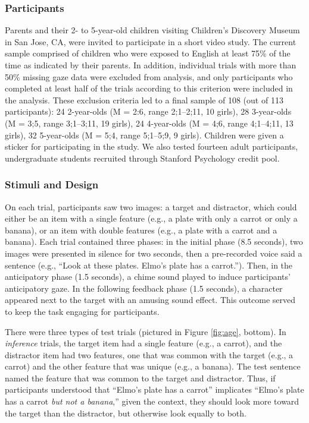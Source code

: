 \documentclass[10pt,letterpaper]{article}
\begin{document}
\subsubsection{Participants}

Parents and their 2- to 5-year-old children visiting Children's Discovery Museum in San Jose, CA, were invited to participate in a short video study. The current sample comprised of children who were exposed to English at least 75\% of the time as indicated by their parents. In addition, individual trials with more than 50\% missing gaze data were excluded from analysis, and only participants who completed at least half of the trials according to this criterion were included in the analysis. These exclusion criteria led to a final sample of 108 (out of 113 participants): 24 2-year-olds (M = 2:6, range 2;1--2;11, 10 girls), 28 3-year-olds (M = 3;5, range 3;1--3;11, 19 girls), 24 4-year-olds (M = 4;6, range 4;1--4;11, 13 girls), 32 5-year-olds (M = 5;4, range 5;1--5;9, 9 girls). Children were given a sticker for participating in the study. We also tested fourteen adult participants, undergraduate students recruited through Stanford Psychology credit pool. 

\subsubsection{Stimuli and Design}

On each trial, participants saw two images: a target and distractor, which could either be an item with a single feature (e.g., a plate with only a carrot or only a banana), or an item with double features (e.g., a plate with a carrot and a banana). Each trial contained three phases: in the initial phase (8.5 seconds), two images were presented in silence for two seconds, then a pre-recorded voice said a sentence (e.g., ``Look at these plates. Elmo's plate has a carrot.''). Then, in the anticipatory phase (1.5 seconds), a chime sound played to induce participants' anticipatory gaze. In the following feedback phase (1.5 seconds), a character appeared next to the target with an amusing sound effect. This outcome served to keep the task engaging for participants.

There were three types of test trials (pictured in Figure \ref{fig:age}, bottom). In \emph{inference} trials, the target item had a single feature (e.g., a carrot), and the distractor item had two features, one that was common with the target (e.g., a carrot) and the other feature that was unique (e.g., a banana). The test sentence named the feature that was common to the target and distractor. Thus, if participants understood that ``Elmo's plate has a carrot'' implicates ``Elmo's plate has a carrot \emph{but not a banana},'' given the context, they should look more toward the target than the distractor, but otherwise look equally to both.
\end{document}
